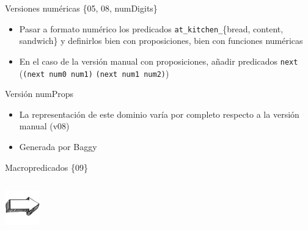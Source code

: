\documentclass[xcolor=table]{beamer}
\begin{document}

\begin{frame}{Versiones numéricas \{05, 08, numDigits\}}
    \begin{itemize}
        \item Pasar a formato numérico los predicados \texttt{at\_kitchen\_}\{bread, content, sandwich\} y definirlos bien con proposiciones, bien con funciones numéricas
        \item En el caso de la versión manual con proposiciones, añadir predicados \texttt{next} (\texttt{(next num0 num1)} \texttt{(next num1 num2)})
    \end{itemize}
    \parbox{2in}{\shadowbox{
        }}
\end{frame}


\begin{frame}{Versión numProps}
    \begin{itemize}
        \item La representación de este dominio varía por completo respecto a la versión manual (v08)
        \item Generada por Baggy
    \end{itemize}
\end{frame}


\begin{frame}{Macropredicados \{09\}}
    \begin{columns}
    
    \parbox{2in}{\shadowbox{
    
    }}
    \parbox{2in}{\shadowbox{
    
    }}
    \parbox{2in}{\shadowbox{
    
    }}
    \parbox{2in}{\shadowbox{
    
    }}
    
    \begin{flushright}
    \includegraphics[width=1.5cm,height=1.5cm]{arrow}
    \end{flushright}
    
    \parbox{2in}{\shadowbox{
    
    }}
    \parbox{2in}{\shadowbox{
    
    }}
    \end{columns}
\end{frame}
\end{document}
